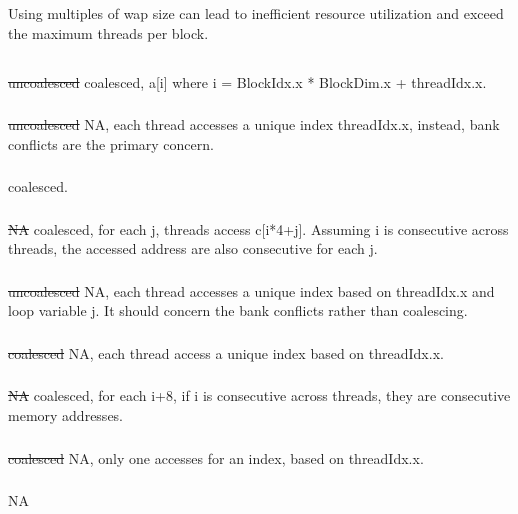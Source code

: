 \documentclass{article}
\begin{document}
Using multiples of wap size can lead to inefficient resource utilization and exceed the maximum threads per block.

\subsection{}
\subsubsection{}
\sout{uncoalesced} coalesced, a[i] where i = BlockIdx.x * BlockDim.x + threadIdx.x.
\subsubsection{}
\sout{uncoalesced} NA, each thread accesses a unique index threadIdx.x, instead, bank conflicts are the primary concern.
\subsubsection{}
coalesced.
\subsubsection{}
\sout{NA} coalesced, for each j, threads access c[i*4+j]. Assuming i is consecutive across threads, the accessed address are also consecutive for each j.
\subsubsection{}
\sout{uncoalesced} NA, each thread accesses a unique index based on threadIdx.x and loop variable j. It should concern the bank conflicts rather than coalescing.
\subsubsection{}
\sout{coalesced} NA, each thread access a unique index based on threadIdx.x.
\subsubsection{}
\sout{NA} coalesced, for each i+8, if i is consecutive across threads, they are consecutive memory addresses.
\subsubsection{}
\sout{coalesced} NA, only one accesses for an index, based on threadIdx.x.
\subsubsection{}
NA
\end{document}
